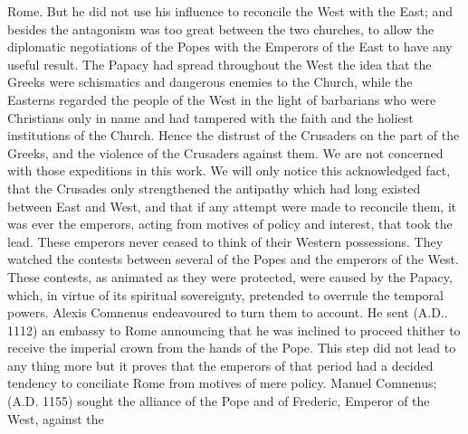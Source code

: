 Rome. But he did not use his influence to reconcile the West with the East; and besides the antagonism was too great between the two churches, to allow the diplomatic negotiations of the Popes with the Emperors of the East to have any useful result. The Papacy had spread throughout the West the idea that the Greeks were schismatics and dangerous enemies to the Church, while the Easterns regarded the people of the West in the light of barbarians who were Christians only in name and had tampered with the faith and the holiest institutions of the Church. Hence the distrust of the Crusaders on the part of the Greeks, and the violence of the Crusaders against them. We are not concerned with those expeditions in this work. We will only notice this acknowledged fact, that the Crusades only strengthened the antipathy which had long existed between East and West, and that if any attempt were made to reconcile them, it was ever the emperors, acting from motives of policy and interest, that took the lead. These emperors never ceased to think of their Western possessions. They watched the contests between several of the Popes and the emperors of the West. These contests, as animated as they were protected, were caused by the Papacy, which, in virtue of its spiritual sovereignty, pretended to overrule the temporal powers. Alexis Comnenus endeavoured to turn them to account. He sent (A.D.. 1112) an embassy to Rome announcing that he was inclined to proceed thither to receive the imperial crown from the hands of the Pope. This step did not lead to any thing more but it proves that the emperors of that period had a decided tendency to conciliate Rome from motives of mere policy. Manuel Comnenus; (A.D. 1155) sought the alliance of the Pope and of Frederic, Emperor of the West, against the

